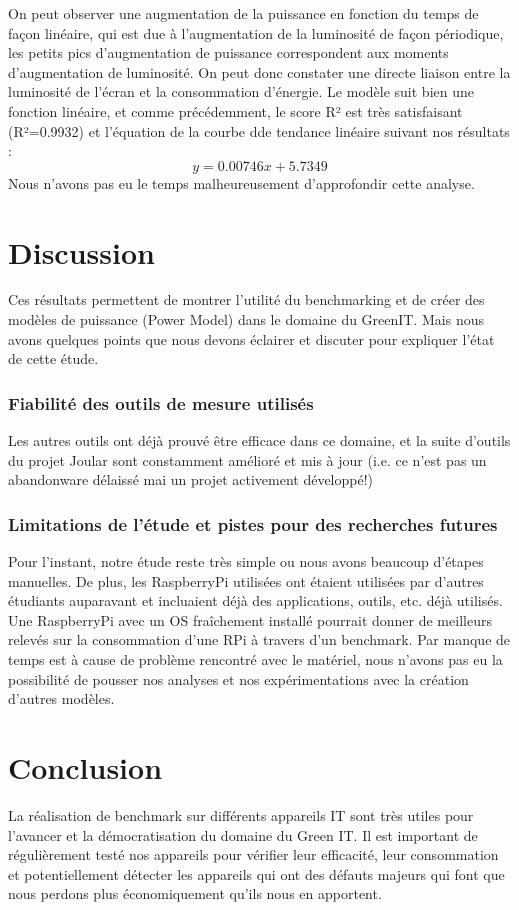 \documentclass[12pt, a4paper]{report}
\begin{document}
On peut observer une augmentation de la puissance en fonction du temps de façon linéaire, qui est due à l'augmentation de la luminosité de façon périodique, les petits pics d'augmentation de puissance correspondent aux moments d'augmentation de luminosité. On peut donc constater une directe liaison entre la luminosité de l'écran et la consommation d'énergie.
Le modèle suit bien une fonction linéaire, et comme précédemment, le score R² est très satisfaisant (R²=0.9932) et l'équation de la courbe dde tendance linéaire suivant nos résultats :
\begin{equation}
    y=0.00746x+5.7349
    \label{eq:moniteur}
\end{equation}
Nous n'avons pas eu le temps malheureusement d'approfondir cette analyse.

\chapter{\centering Discussion}
Ces résultats permettent de montrer l'utilité du benchmarking et de créer des modèles de puissance (Power Model) dans le domaine du GreenIT.
Mais nous avons quelques points que nous devons éclairer et discuter pour expliquer l'état de cette étude.

\subsection{Fiabilité des outils de mesure utilisés}
Les autres outils ont déjà prouvé être efficace dans ce domaine, et la suite d'outils du projet Joular sont constamment amélioré et mis à jour (i.e. ce n'est pas un abandonware délaissé mai un projet activement développé!)

\subsection{Limitations de l'étude et pistes pour des recherches futures}
Pour l'instant, notre étude reste très simple ou nous avons beaucoup d'étapes manuelles. De plus, les RaspberryPi utilisées ont étaient utilisées par d'autres étudiants auparavant et incluaient déjà des applications, outils, etc. déjà utilisés. Une RaspberryPi avec un OS fraîchement installé pourrait donner de meilleurs relevés sur la consommation d'une RPi à travers d'un benchmark.
Par manque de temps est à cause de problème rencontré avec le matériel, nous n'avons pas eu la possibilité de pousser nos analyses et nos expérimentations avec la création d'autres modèles.

\chapter{\centering Conclusion}
La réalisation de benchmark sur différents appareils IT sont très utiles pour l'avancer et la démocratisation du domaine du Green IT.
Il est important de régulièrement testé nos appareils pour vérifier leur efficacité, leur consommation et potentiellement détecter les appareils qui ont des défauts majeurs qui font que nous perdons plus économiquement qu'ils nous en apportent.
\end{document}
